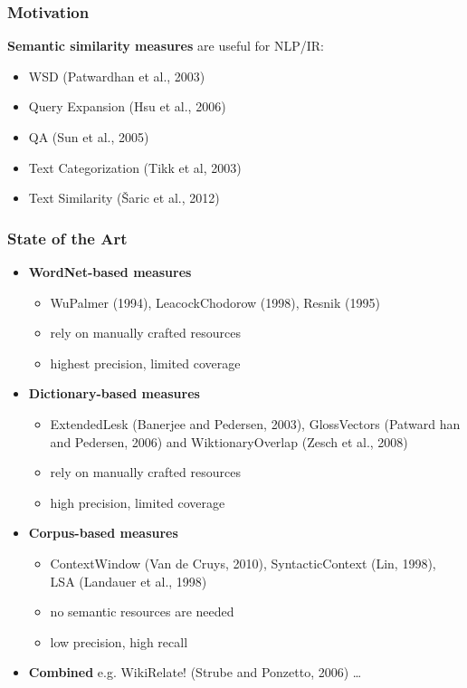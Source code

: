 \documentclass{beamer}
\begin{document}
\begin{frame}
\frametitle{Motivation}

\item \textbf{Semantic similarity measures} are useful for NLP/IR:
\begin{itemize}
  \item WSD (Patwardhan et al., 2003)
  \item Query Expansion (Hsu et al., 2006)
  \item QA (Sun et al., 2005)	
  \item Text Categorization (Tikk et al, 2003)
  \item Text Similarity (Šaric et al., 2012)
\end{itemize}

\end{frame}



\begin{frame}
\frametitle{State of the Art}

\begin{itemize}
  \item \textbf{WordNet-based measures}

  \begin{itemize}
  	\item WuPalmer (1994), LeacockChodorow (1998), Resnik (1995)
  	\item rely on manually crafted resources
  	\item highest precision, limited coverage   
  \end{itemize}
  
  \item \textbf{Dictionary-based measures}
	\begin{itemize}
	  \item ExtendedLesk (Banerjee and Pedersen, 2003), GlossVectors (Patward
han and Pedersen, 2006) and WiktionaryOverlap (Zesch et al., 2008)
	\item rely on manually crafted resources
	 \item high precision, limited coverage
	\end{itemize}

\item  \textbf{Corpus-based measures}
\begin{itemize}
  \item ContextWindow (Van de Cruys, 2010), SyntacticContext (Lin, 1998),  LSA (Landauer et al., 1998)
  
 \item no semantic resources are needed
 \item low precision, high recall 
\end{itemize}

\item \textbf{Combined} e.g. WikiRelate! (Strube and Ponzetto, 2006) \ldots
\end{itemize}
\end{frame}
\end{document}
